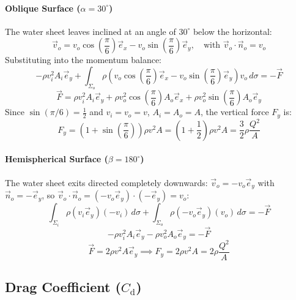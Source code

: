 \documentclass[11pt,a4paper]{article}
\numberwithin{equation}{section}
\begin{document}
\paragraph{Oblique Surface ($\alpha = 30^\circ$)}
The water sheet leaves inclined at an angle of $30^\circ$ below the horizontal:
\begin{equation}
    \vec{v}_o = v_o \cos\left(\frac{\pi}{6}\right) \vec{e}_x - v_o \sin\left(\frac{\pi}{6}\right) \vec{e}_y, \quad \text{with } \vec{v}_o \cdot \vec{n}_o = v_o
\end{equation}
Substituting into the momentum balance:
\begin{equation}
    -\rho v_i^2 A_i \vec{e}_y + \int_{\Sigma_o} \rho \left( v_o \cos\left(\frac{\pi}{6}\right)\vec{e}_x - v_o \sin\left(\frac{\pi}{6}\right)\vec{e}_y \right) v_o \, d\sigma = -\vec{F}
\end{equation}
\begin{equation}
    \vec{F} = \rho v_i^2 A_i \vec{e}_y + \rho v_o^2 \cos\left(\frac{\pi}{6}\right) A_o \vec{e}_x + \rho v_o^2 \sin\left(\frac{\pi}{6}\right) A_o \vec{e}_y
\end{equation}
Since $\sin(\pi/6) = \frac{1}{2}$ and $v_i = v_o = v$, $A_i = A_o = A$, the vertical force $F_y$ is:
\begin{equation}
    F_y = \left(1 + \sin\left(\frac{\pi}{6}\right)\right) \rho v^2 A = \left(1 + \frac{1}{2}\right) \rho v^2 A = \frac{3}{2} \rho \frac{Q^2}{A}
\end{equation}

\paragraph{Hemispherical Surface ($\beta = 180^\circ$)}
The water sheet exits directed completely downwards: $\vec{v}_o = -v_o \vec{e}_y$ with $\vec{n}_o = -\vec{e}_y$, so $\vec{v}_o \cdot \vec{n}_o = (-v_o \vec{e}_y) \cdot (-\vec{e}_y) = v_o$:
\begin{equation}
    \int_{\Sigma_i} \rho (v_i \vec{e}_y)(-v_i) \, d\sigma + \int_{\Sigma_o} \rho (-v_o \vec{e}_y)(v_o) \, d\sigma = -\vec{F}
\end{equation}
\begin{equation}
    -\rho v_i^2 A_i \vec{e}_y - \rho v_o^2 A_o \vec{e}_y = -\vec{F}
\end{equation}
\begin{equation}
    \vec{F} = 2\rho v^2 A \vec{e}_y \implies F_y = 2\rho v^2 A = 2\rho \frac{Q^2}{A}
\end{equation}
\subsection{Drag Coefficient ($C_{\mathrm{d}}$)}
\end{document}
